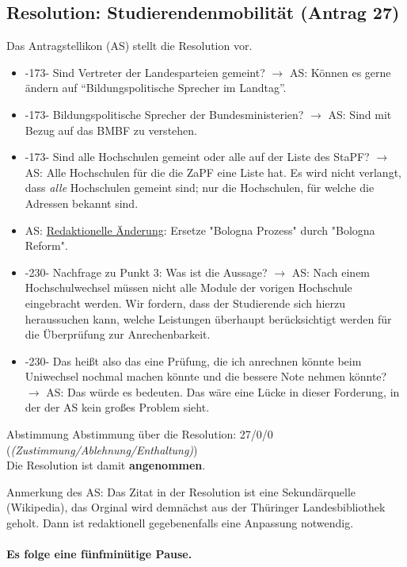   \subsection{Resolution: Studierendenmobilität (Antrag 27)}
    Das Antragstellikon (AS) stellt die Resolution vor.
    \begin{itemize}
      \item -173- Sind Vertreter der Landesparteien gemeint?
        $\rightarrow$ AS: Können es gerne ändern auf ``Bildungspolitische Sprecher im Landtag''.
      \item -173- Bildungspolitische Sprecher der Bundesministerien?
        $\rightarrow$ AS: Sind mit Bezug auf das BMBF zu verstehen.
      \item -173- Sind alle Hochschulen gemeint oder alle auf der Liste des StaPF?
        $\rightarrow$ AS: Alle Hochschulen für die die ZaPF eine Liste hat. Es wird nicht verlangt, dass \textit{alle} Hochschulen gemeint sind; nur die Hochschulen, für welche die Adressen bekannt sind.
      \item AS: \underline{Redaktionelle Änderung}: Ersetze "Bologna Prozess" durch "Bologna Reform".
      \item -230- Nachfrage zu Punkt 3: Was ist die Aussage?
        $\rightarrow$ AS: Nach einem Hochschulwechsel müssen nicht alle Module der vorigen Hochschule eingebracht werden. Wir fordern, dass der Studierende sich hierzu heraussuchen kann, welche Leistungen überhaupt berücksichtigt werden für die Überprüfung zur Anrechenbarkeit.
      \item -230- Das heißt also das eine Prüfung, die ich anrechnen könnte beim Uniwechsel nochmal machen könnte und die bessere Note nehmen könnte?
        $\rightarrow$ AS: Das würde es bedeuten. Das wäre eine Lücke in dieser Forderung, in der der AS kein großes Problem sieht.
    \end{itemize}

    \begin{success}{Abstimmung}
      Abstimmung über die Resolution: 27/0/0 (\textit{(Zustimmung/Ablehnung/Enthaltung)}) \\
      Die Resolution ist damit \textbf{angenommen}.
    \end{success}

    Anmerkung des AS: Das Zitat in der Resolution ist eine Sekundärquelle (Wikipedia), das Orginal wird demnächst aus der Thüringer Landesbibliothek geholt. Dann ist redaktionell gegebenenfalls eine Anpassung notwendig.

    \paragraph{Es folge eine fünfminütige Pause.}

